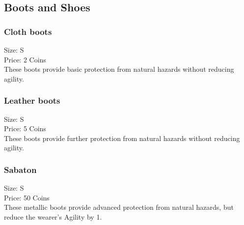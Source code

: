 \subsection{Boots and Shoes}\label{subsec:bootsAndShoes}

\subsubsection{Cloth boots}\label{item:clothboots}
Size: S\\
Price: 2 Coins\\
These boots provide basic protection from natural hazards without reducing agility.

\subsubsection{Leather boots}\label{item:leatherboots}
Size: S\\
Price: 5 Coins\\
These boots provide further protection from natural hazards without reducing agility.

\subsubsection{Sabaton}\label{item:sabaton}
Size: S\\
Price: 50 Coins\\
These metallic boots provide advanced protection from natural hazards, but reduce the wearer's Agility by 1.